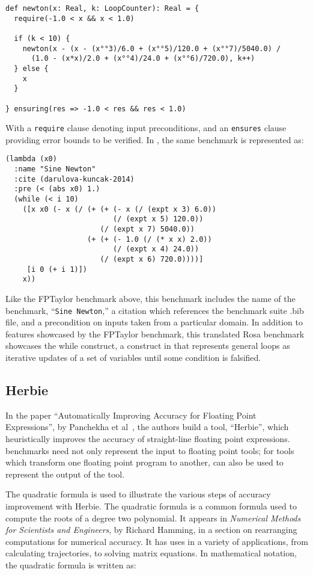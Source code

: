 \documentclass[main.tex]{subfiles}
\begin{document}
\begin{verbatim}
def newton(x: Real, k: LoopCounter): Real = {
  require(-1.0 < x && x < 1.0)

  if (k < 10) {
    newton(x - (x - (x°°3)/6.0 + (x°°5)/120.0 + (x°°7)/5040.0) / 
      (1.0 - (x*x)/2.0 + (x°°4)/24.0 + (x°°6)/720.0), k++)
  } else {
    x
  }
  
} ensuring(res => -1.0 < res && res < 1.0)
\end{verbatim}

With a \verb|require| clause denoting input preconditions, and an
\verb|ensures| clause providing error bounds to be verified. In
\name, the same benchmark is represented as:

\begin{verbatim}
(lambda (x0)
  :name "Sine Newton"
  :cite (darulova-kuncak-2014)
  :pre (< (abs x0) 1.)
  (while (< i 10)
    ([x x0 (- x (/ (+ (+ (- x (/ (expt x 3) 6.0)) 
                         (/ (expt x 5) 120.0))
                      (/ (expt x 7) 5040.0))
                   (+ (+ (- 1.0 (/ (* x x) 2.0)) 
                         (/ (expt x 4) 24.0)) 
                      (/ (expt x 6) 720.0))))]
     [i 0 (+ i 1)])
    x))
\end{verbatim}

Like the FPTaylor benchmark above, this benchmark includes the name of
the benchmark, ``\verb|Sine Newton|,'' a citation which references the
benchmark suite .bib file, and a precondition on inputs taken from a
particular domain. In addition to features showcased by the FPTaylor
benchmark, this translated Rosa benchmark showcases the while
construct, a construct in \core that represents general loops as
iterative updates of a set of variables until some condition is
falsified.

\subsection{Herbie}

In the paper ``Automatically Improving Accuracy for Floating Point
Expressions'', by Panchekha et al~\cite{pavel15}, the authors build a
tool, ``Herbie'', which heuristically improves the accuracy of
straight-line floating point expressions. \name benchmarks need not
only represent the input to floating point tools; for tools which
transform one floating point program to another, \core can also be
used to represent the output of the tool.

The quadratic formula is used to illustrate the various steps of
accuracy improvement with Herbie. The quadratic formula is a common
formula used to compute the roots of a degree two polynomial. It
appears in \textit{Numerical Methods for Scientists and Engineers}, by
Richard Hamming, in a section on rearranging computations for
numerical accuracy. It has uses in a variety of applications, from
calculating trajectories, to solving matrix equations. In mathematical
notation, the quadratic formula is written as:
\end{document}
